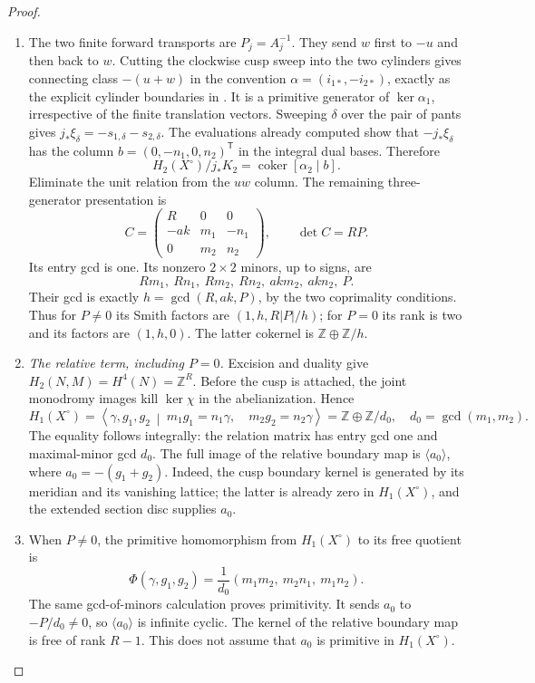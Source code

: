 \begin{proof}
\begin{enumerate}[label=\arabic*.,leftmargin=*]
\item The two finite forward transports are $P_j=A_j^{-1}$.
They send $w$ first to $-u$ and then back to $w$.
Cutting the clockwise cusp sweep into the two cylinders gives
connecting class $-(u+w)$ in the convention
$\alpha=(i_{1*},-i_{2*})$, exactly as the explicit cylinder
boundaries in \cite[Lemma 7.10, Appendix B.4]{manYang26}.
It is a primitive generator of $\ker\alpha_1$, irrespective
of the finite translation vectors. Sweeping $\delta$ over the
pair of pants gives
$j_*\xi_\delta=-s_{1,\delta}-s_{2,\delta}$.
The evaluations already computed show that $-j_*\xi_\delta$
has the column $b=(0,-n_1,0,n_2)^{\mathsf T}$ in the integral
dual bases. Therefore
\[
 H_2(X^\circ)/j_*K_2
    =\operatorname{coker}[\alpha_2\mid b].
\]
Eliminate the unit relation from the $uw$ column. The remaining
three-generator presentation is
\[
 C=\begin{pmatrix}
 R&0&0\\-ak&m_1&-n_1\\0&m_2&n_2
 \end{pmatrix},\qquad \det C=RP.
\]
Its entry gcd is one. Its nonzero $2\times2$ minors, up to signs,
are
\[
 Rm_1,\ Rn_1,\ Rm_2,\ Rn_2,\ akm_2,\ akn_2,\ P.
\]
Their gcd is exactly $h=\gcd(R,ak,P)$, by the two coprimality
conditions. Thus for $P\ne0$ its Smith factors are
$(1,h,R|P|/h)$; for $P=0$ its rank is two and its factors are
$(1,h,0)$. The latter cokernel is $\mathbb Z\oplus\mathbb Z/h$.

\item \emph{The relative term, including $P=0$.}
Excision and duality give $H_2(N,M)=H^4(N)=\mathbb Z^R$.
Before the cusp is attached, the joint monodromy images kill
$\ker\chi$ in the abelianization. Hence
\[
 H_1(X^\circ)=\left\langle\gamma,g_1,g_2\ \middle|\
 m_1g_1=n_1\gamma,\quad m_2g_2=n_2\gamma\right\rangle
       =\mathbb Z\oplus\mathbb Z/d_0,
 \quad d_0=\gcd(m_1,m_2).
\]
The equality follows integrally: the relation matrix has entry
gcd one and maximal-minor gcd $d_0$.
The full image of the relative boundary map is
$\langle a_0\rangle$, where $a_0=-(g_1+g_2)$.
Indeed, the cusp boundary kernel is generated by its meridian
and its vanishing lattice; the latter is already zero in
$H_1(X^\circ)$, and the extended section disc supplies $a_0$.

\item When $P\ne0$, the primitive homomorphism from $H_1(X^\circ)$
to its free quotient is
\[
 \Phi(\gamma,g_1,g_2)
 =\frac1{d_0}(m_1m_2,\ m_2n_1,\ m_1n_2).
\]
The same gcd-of-minors calculation proves primitivity.
It sends $a_0$ to $-P/d_0\ne0$, so $\langle a_0\rangle$
is infinite cyclic. The kernel of the relative boundary map
is free of rank $R-1$. This does not assume that $a_0$ is
primitive in $H_1(X^\circ)$.


\end{enumerate}
\end{proof}
